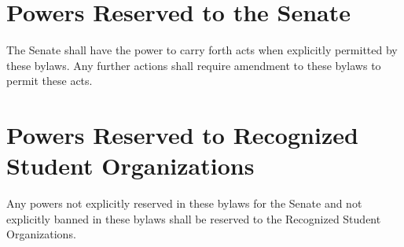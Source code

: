 \documentclass[12pt]{scrreprt}
\begin{document}
\chapter{Powers Reserved to the Senate} \label{sec:senate_powers}
The Senate shall have the power to carry forth acts when explicitly permitted 
by these bylaws. Any further actions shall require amendment to these bylaws 
to permit these acts. 

\chapter{Powers Reserved to Recognized Student Organizations} \label{sec:rso_powers}
Any powers not explicitly reserved in these bylaws for the Senate and not 
explicitly banned in these bylaws shall be reserved to the Recognized Student 
Organizations.
\end{document}
